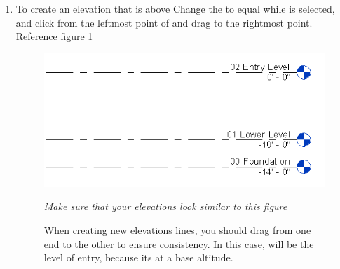 \documentclass{tufte-book} %
\begin{document}
\begin{enumerate}
\begin{marginfigure}
	\end{marginfigure}
	
	\item To create an elevation that is  above  Change the  to equal  while  is selected, and click from the leftmost point of  and drag to the rightmost point. Reference figure \ref{fig:revelevlinethree}
	
	\begin{figure}
		\includegraphics[width=\linewidth]{revitelevationlinethree.png}
		\caption[Shortened elevation lines]{When creating new elevations lines, you should drag from one end to the other to ensure consistency. In this case,  will be the level of entry, because its at a base altitude.}
		\emph{Make sure that your elevations look similar to this figure}
		\label{fig:revelevlinethree}
	\end{figure}
	

\end{enumerate}
\end{document}
